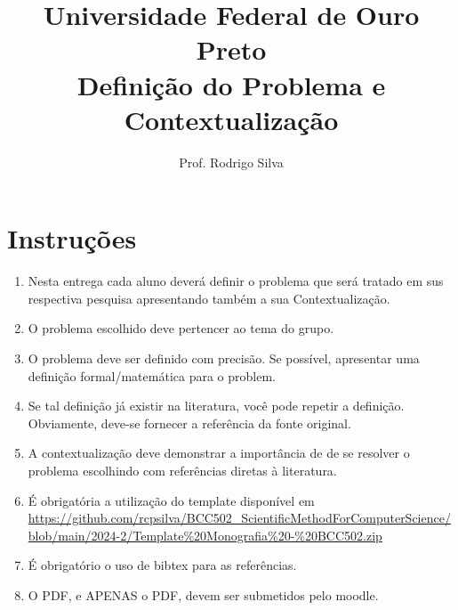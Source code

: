 \documentclass{article}
\title{\vspace{-2 cm}Universidade Federal de Ouro Preto \\ Definição do Problema e Contextualização}
\author{Prof. Rodrigo Silva}
\date{}
\begin{document}
\maketitle

\section*{Instruções}

\begin{enumerate}
    \item Nesta entrega cada aluno deverá definir o problema que será tratado em sus respectiva pesquisa apresentando também a sua Contextualização.
    \item O problema escolhido deve pertencer ao tema do grupo.
    \item O problema deve ser definido com precisão. Se possível, apresentar uma definição formal/matemática para o problem. 
    \item Se tal definição já existir na literatura, você pode repetir a definição. Obviamente, deve-se fornecer a referência da fonte original. 
    \item A contextualização deve demonstrar a importância de de se resolver o problema escolhindo com referências diretas à literatura. 
    \item É obrigatória a utilização do template disponível em \url{https://github.com/rcpsilva/BCC502_ScientificMethodForComputerScience/blob/main/2024-2/Template%20Monografia%20-%20BCC502.zip}
    \item É obrigatório o uso de bibtex para as referências. 
    \item O PDF, e APENAS o PDF, devem ser submetidos pelo moodle.  
\end{enumerate}    




%
%
\end{document}
